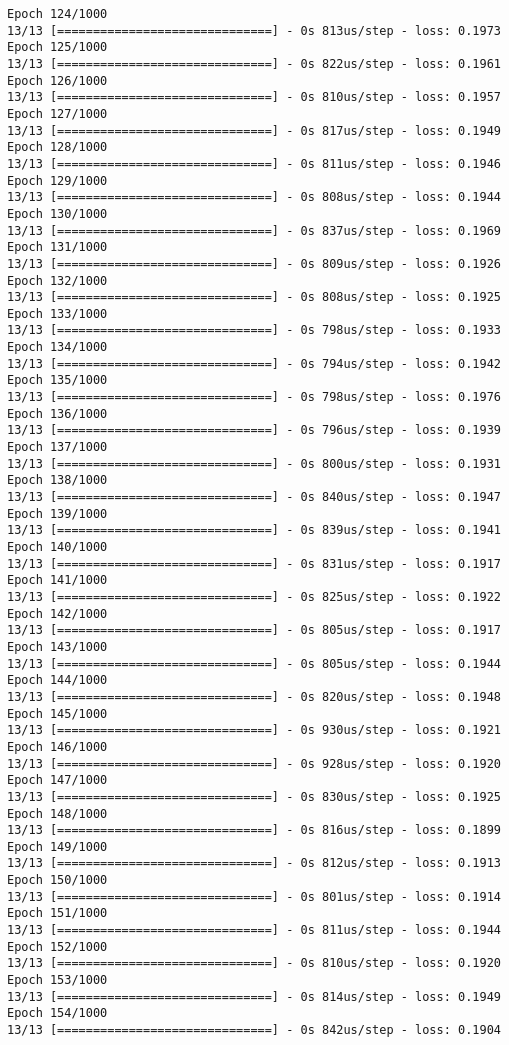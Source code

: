 \documentclass[11pt]{article}
\begin{document}
\begin{Verbatim}[commandchars=\\\{\}]
Epoch 124/1000
13/13 [==============================] - 0s 813us/step - loss: 0.1973
Epoch 125/1000
13/13 [==============================] - 0s 822us/step - loss: 0.1961
Epoch 126/1000
13/13 [==============================] - 0s 810us/step - loss: 0.1957
Epoch 127/1000
13/13 [==============================] - 0s 817us/step - loss: 0.1949
Epoch 128/1000
13/13 [==============================] - 0s 811us/step - loss: 0.1946
Epoch 129/1000
13/13 [==============================] - 0s 808us/step - loss: 0.1944
Epoch 130/1000
13/13 [==============================] - 0s 837us/step - loss: 0.1969
Epoch 131/1000
13/13 [==============================] - 0s 809us/step - loss: 0.1926
Epoch 132/1000
13/13 [==============================] - 0s 808us/step - loss: 0.1925
Epoch 133/1000
13/13 [==============================] - 0s 798us/step - loss: 0.1933
Epoch 134/1000
13/13 [==============================] - 0s 794us/step - loss: 0.1942
Epoch 135/1000
13/13 [==============================] - 0s 798us/step - loss: 0.1976
Epoch 136/1000
13/13 [==============================] - 0s 796us/step - loss: 0.1939
Epoch 137/1000
13/13 [==============================] - 0s 800us/step - loss: 0.1931
Epoch 138/1000
13/13 [==============================] - 0s 840us/step - loss: 0.1947
Epoch 139/1000
13/13 [==============================] - 0s 839us/step - loss: 0.1941
Epoch 140/1000
13/13 [==============================] - 0s 831us/step - loss: 0.1917
Epoch 141/1000
13/13 [==============================] - 0s 825us/step - loss: 0.1922
Epoch 142/1000
13/13 [==============================] - 0s 805us/step - loss: 0.1917
Epoch 143/1000
13/13 [==============================] - 0s 805us/step - loss: 0.1944
Epoch 144/1000
13/13 [==============================] - 0s 820us/step - loss: 0.1948
Epoch 145/1000
13/13 [==============================] - 0s 930us/step - loss: 0.1921
Epoch 146/1000
13/13 [==============================] - 0s 928us/step - loss: 0.1920
Epoch 147/1000
13/13 [==============================] - 0s 830us/step - loss: 0.1925
Epoch 148/1000
13/13 [==============================] - 0s 816us/step - loss: 0.1899
Epoch 149/1000
13/13 [==============================] - 0s 812us/step - loss: 0.1913
Epoch 150/1000
13/13 [==============================] - 0s 801us/step - loss: 0.1914
Epoch 151/1000
13/13 [==============================] - 0s 811us/step - loss: 0.1944
Epoch 152/1000
13/13 [==============================] - 0s 810us/step - loss: 0.1920
Epoch 153/1000
13/13 [==============================] - 0s 814us/step - loss: 0.1949
Epoch 154/1000
13/13 [==============================] - 0s 842us/step - loss: 0.1904

\end{Verbatim}
\end{document}
